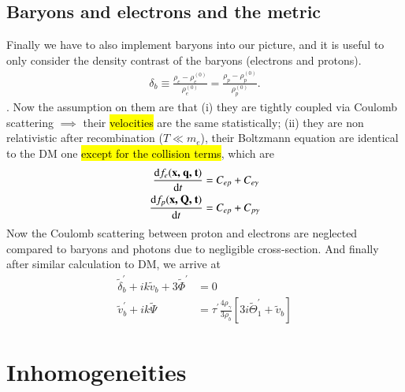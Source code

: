 \documentclass[a4paper, 12pt]{article}
\begin{document}
{{    \subsection{Baryons and electrons and the metric}%
      \label{sub:Baryons and electrons and the metric}
      Finally we have to also implement baryons into our picture,
      and it is useful to only consider the density contrast of the
      baryons (electrons and protons). 
      \begin{align}
        \label{density contrast}
        \delta_{b} \equiv \frac{\rho_{e} -
        \rho_{e}^{(0)}}{\rho_{e}^{(0)}} = \frac{\rho_{p} -
        \rho_{p}^{(0)}}{\rho_{p}^{(0)}}.
      \end{align}. Now the assumption on them are that (i) they are
      tightly coupled via Coulomb scattering \( \implies \) their
      \hl{velocities} are the same statistically; (ii) they are non
      relativistic after recombination (\( T \ll m_{e} \)), their
      Boltzmann equation are identical to the DM one
      \hl{except for the collision terms}, which are 
      \begin{align}
        \label{Baryon boltzmann}
        \frac{\mathrm{d}f_{e}(\textbf{x,
        \textbf{q}, t})}{\mathrm{d}t} &= C_{ep} + C_{e \gamma} \\  
        \frac{\mathrm{d}f_{p}(\textbf{x,
        \textbf{Q}, t})}{\mathrm{d}t} &= C_{ep} + C_{p \gamma}   
      \end{align}
    Now the Coulomb scattering between proton and electrons are neglected
    compared to baryons and photons due to negligible cross-section. 
    And finally after similar calculation to DM, we arrive at 
    \begin{align}
      \label{1st order baryons}
      \tilde{\delta}_{b}^{\prime} + ik \tilde{v}_{b} + 3
      \tilde{\Phi}^{\prime} &=   0\\ 
      \tilde{v}^{\prime}_{b} + i k \tilde{\Psi} &= \tau^{\prime}
      \frac{4 \rho_{\gamma}}{3 \rho_{b}}[3 i
      \tilde{\Theta}^{\prime}_1 + \tilde{v}_{b}]
    \end{align}

\section{Inhomogeneities}%
  \label{sec:Inhomogeneities}
  
}}
\end{document}
